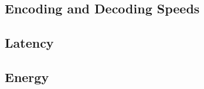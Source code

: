 \label{sec:metrics}
\subsection{Encoding and Decoding Speeds}
\subsection{Latency}
\subsection{Energy}

